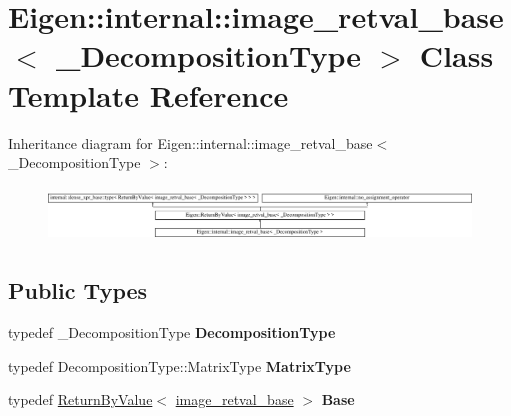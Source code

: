 \hypertarget{struct_eigen_1_1internal_1_1image__retval__base}{}\section{Eigen\+::internal\+::image\+\_\+retval\+\_\+base$<$ \+\_\+\+Decomposition\+Type $>$ Class Template Reference}
\label{struct_eigen_1_1internal_1_1image__retval__base}
Inheritance diagram for Eigen\+::internal\+::image\+\_\+retval\+\_\+base$<$ \+\_\+\+Decomposition\+Type $>$\+:\begin{figure}[H]
\begin{center}
\leavevmode
\includegraphics[height=1.471103cm]{struct_eigen_1_1internal_1_1image__retval__base}
\end{center}
\end{figure}
\subsection*{Public Types}
\begin{DoxyCompactItemize}
\item 
\mbox{\label{struct_eigen_1_1internal_1_1image__retval__base_adb24802c361cc4559c518acaa7cf4d72}} 
typedef \+\_\+\+Decomposition\+Type {\bfseries Decomposition\+Type}
\item 
\mbox{\label{struct_eigen_1_1internal_1_1image__retval__base_aea25a8fb269a6a7db4229e13f9aaf068}} 
typedef Decomposition\+Type\+::\+Matrix\+Type {\bfseries Matrix\+Type}
\item 
\mbox{\label{struct_eigen_1_1internal_1_1image__retval__base_a73365141007eacd1857dabdc5a51f984}} 
typedef \mbox{\hyperlink{class_eigen_1_1_return_by_value}{Return\+By\+Value}}$<$ \mbox{\hyperlink{struct_eigen_1_1internal_1_1image__retval__base}{image\+\_\+retval\+\_\+base}} $>$ {\bfseries Base}
\end{DoxyCompactItemize}
